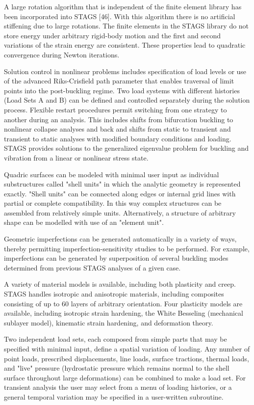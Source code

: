 A large rotation algorithm that is independent of the finite element
library has been incorporated into STAGS [46].  With this algorithm there
is no artificial stiffening due to large rotations.  The finite elements
in the STAGS library do not store energy under arbitrary rigid-body motion
and the first and second variations of the strain energy are consistent.
These properties lead to quadratic convergence during Newton iterations. 

Solution control in nonlinear problems includes specification of load
levels or use of the advanced Riks-Crisfield path parameter that enables
traversal of limit points into the post-buckling regime. Two load systems
with different histories (Load Sets A and B) can be defined and controlled
separately during the solution process. Flexible restart procedures permit
switching from one strategy to another during an analysis.  This includes
shifts from bifurcation buckling to nonlinear collapse analyses and back
and shifts from static to transient and transient to static analyses with
modified boundary conditions and loading.  STAGS provides solutions to the
generalized eigenvalue problem for buckling and vibration from a linear or
nonlinear stress state. 

Quadric surfaces can be modeled with minimal user input as individual
substructures called "shell units" in which the analytic geometry is
represented exactly. "Shell units" can be connected along edges or
internal grid lines with partial or complete compatibility.  In this way
complex structures can be assembled from relatively simple units.
Alternatively, a structure of arbitrary shape can be modelled with use of
an "element unit". 

Geometric imperfections can be generated automatically in a variety of
ways, thereby permitting imperfection-sensitivity studies to be performed.
 For example,  imperfections can be generated by superposition of several
buckling modes determined from previous STAGS analyses of a given case. 

A variety of material models is available, including both plasticity and
creep.  STAGS handles isotropic and anisotropic materials, including
composites consisting of up to 60 layers of arbitrary orientation. Four
plasticity models are available, including isotropic strain hardening, the
White Besseling (mechanical sublayer model), kinematic strain hardening,
and deformation theory. 

Two independent load sets, each composed from simple parts that may be
specified with minimal input, define a spatial variation of loading. Any
number of point loads, prescribed displacements, line loads, surface
tractions, thermal loads, and "live" pressure (hydrostatic pressure which
remains normal to the shell surface throughout large deformations) can be
combined to make a load set. For transient analysis the user may select
from a menu of loading histories, or a general temporal variation may be
specified in a user-written subroutine. 

